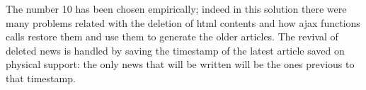 The number 10 has been chosen empirically; indeed in this solution there were many problems related with the deletion of html contents and how ajax functions calls restore them and use them to generate the older articles. The revival of deleted news is handled by saving the timestamp of the latest article saved on physical support: the only news that will be written will be the ones previous to that timestamp.
\par 
\par  
